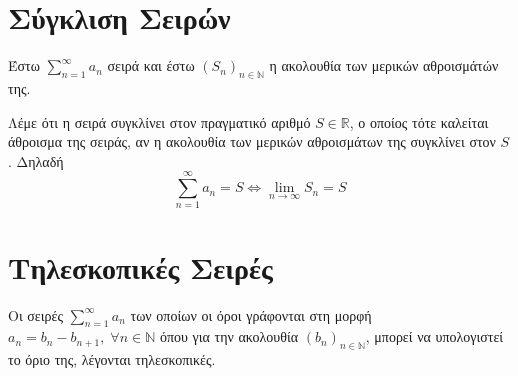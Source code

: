 \documentclass[main.tex]{subfiles}
\begin{document}
\section{Σύγκλιση Σειρών}

Έστω $ \sum_{n=1}^{\infty} a_{n}  $ σειρά και έστω $ {(S_{n})}_{n \in \mathbb{N}} $ 
η ακολουθία των μερικών αθροισμάτών της. 

Λέμε ότι η σειρά συγκλίνει στον πραγματικό αριθμό $ S \in \mathbb{R} $, ο οποίος 
τότε καλείται άθροισμα της σειράς, αν η ακολουθία των μερικών αθροισμάτων 
της συγκλίνει στον $ S $. Δηλαδή
\[
    \sum_{n=1}^{\infty} a_{n} = S \Leftrightarrow \lim_{n \to \infty} S_{n} = S  
\] 

\section{Τηλεσκοπικές Σειρές}

\begin{dfn}
    Οι σειρές $ \sum_{n=1}^{\infty} a_{n} $ των οποίων 
    οι όροι γράφονται στη μορφή 
    $ a_{n} = b_{n} - b_{n+1}, \; \forall n \in \mathbb{N} $ όπου για την ακολουθία
    $ {(b_{n})}_{n \in \mathbb{N}}$, μπορεί να υπολογιστεί το όριο της, λέγονται 
    τηλεσκοπικές.
\end{dfn}
\end{document}
